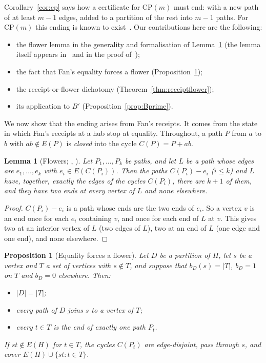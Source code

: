 \documentclass[11pt]{amsart}
\newtheorem{lemma}[theorem]{Lemma}
\newtheorem{proposition}[theorem]{Proposition}
\theoremstyle{definition}
\begin{document}
Corollary~\ref{cor:cp} says how a certificate for $\mathrm{CP}(m)$ must end: with a new path of at
least $m-1$ edges, added to a partition of the rest into $m-1$ paths. For $\mathrm{CP}(m)$ this ending
is known to exist~\cite[Theorem~10.21]{SP}. Our contributions here are the following:
\begin{itemize}
\item the flower lemma in the generality and formalisation of Lemma~\ref{lem:flower} (the lemma itself
appears in~\cite{MM} and in the proof of~\cite[Theorem~38]{MR});
\item the fact that Fan's equality forces a flower (Proposition~\ref{prop:equality});
\item the receipt-or-flower dichotomy (Theorem~\ref{thm:receiptflower});
\item its application to $B'$ (Proposition~\ref{prop:Bprime}).
\end{itemize}
We now show that the ending arises from Fan's receipts. It comes from the state in which Fan's receipts at a hub stop at equality. Throughout, a
path $P$ from $a$ to $b$ with $ab\notin E(P)$ is \emph{closed} into the cycle $C(P)=P+ab$.

\begin{lemma}[Flowers; {\cite[Lemma~5.4]{MM}}, {\cite[proof of Theorem~38]{MR}}]\label{lem:flower}
Let $P_1,\dots,P_k$ be paths, and let $L$ be a path whose edges are $e_1,\dots,e_k$ with $e_i\in
E(C(P_i))$. Then the paths $C(P_i)-e_i$ ($i\le k$) and $L$ have, together, exactly the edges of the
cycles $C(P_i)$, there are $k+1$ of them, and they have two ends at every vertex of $L$ and none
elsewhere.
\end{lemma}

\begin{proof}
$C(P_i)-e_i$ is a path whose ends are the two ends of $e_i$. So a vertex $v$ is an end once for each
$e_i$ containing $v$, and once for each end of $L$ at $v$. This gives two at an interior vertex of
$L$ (two edges of $L$), two at an end of $L$ (one edge and one end), and none elsewhere.
\end{proof}

\begin{proposition}[Equality forces a flower]\label{prop:equality}
Let $D$ be a partition of $H$, let $s$ be a vertex and $T$ a set of vertices with $s\notin T$, and
suppose that $b_D(s)=|T|$, $b_D=1$ on $T$ and $b_D=0$ elsewhere. Then:
\begin{itemize}
\item $|D|=|T|$;
\item every path of $D$ joins $s$ to a vertex of $T$;
\item every $t\in T$ is the end of exactly one path $P_t$.
\end{itemize}
If $st\notin E(H)$ for $t\in T$, the cycles $C(P_t)$ are edge-disjoint, pass through $s$, and cover
$E(H)\cup\{st:t\in T\}$.
\end{proposition}
\end{document}
